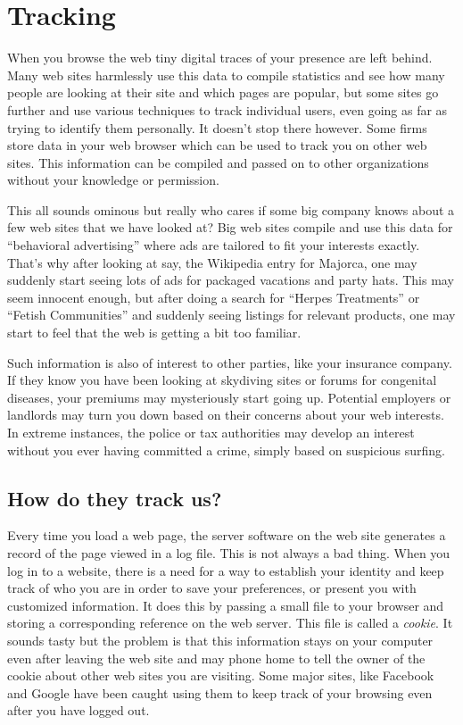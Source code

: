\section{Tracking}

When you browse the web tiny digital traces of your presence are left
behind. Many web sites harmlessly use this data to compile statistics
and see how many people are looking at their site and which pages are
popular, but some sites go further and use various techniques to track
individual users, even going as far as trying to identify them
personally. It doesn't stop there however. Some firms store data in your
web browser which can be used to track you on other web sites. This
information can be compiled and passed on to other organizations without
your knowledge or permission.

This all sounds ominous but really who cares if some big company knows
about a few web sites that we have looked at? Big web sites compile and
use this data for ``behavioral advertising'' where ads are tailored to
fit your interests exactly. That's why after looking at say, the
Wikipedia entry for Majorca, one may suddenly start seeing lots of ads
for packaged vacations and party hats. This may seem innocent enough,
but after doing a search for ``Herpes Treatments'' or ``Fetish
Communities'' and suddenly seeing listings for relevant products, one
may start to feel that the web is getting a bit too familiar.

Such information is also of interest to other parties, like your
insurance company. If they know you have been looking at skydiving sites
or forums for congenital diseases, your premiums may mysteriously start
going up. Potential employers or landlords may turn you down based on
their concerns about your web interests. In extreme instances, the
police or tax authorities may develop an interest without you ever
having committed a crime, simply based on suspicious surfing.

\subsection{How do they track us?}

Every time you load a web page, the server software on the web site
generates a record of the page viewed in a log file. This is not always
a bad thing. When you log in to a website, there is a need for a way to
establish your identity and keep track of who you are in order to save
your preferences, or present you with customized information. It does
this by passing a small file to your browser and storing a corresponding
reference on the web server. This file is called a \emph{cookie}. It
sounds tasty but the problem is that this information stays on your
computer even after leaving the web site and may phone home to tell the
owner of the cookie about other web sites you are visiting. Some major
sites, like Facebook and Google have been caught using them to keep
track of your browsing even after you have logged out.

